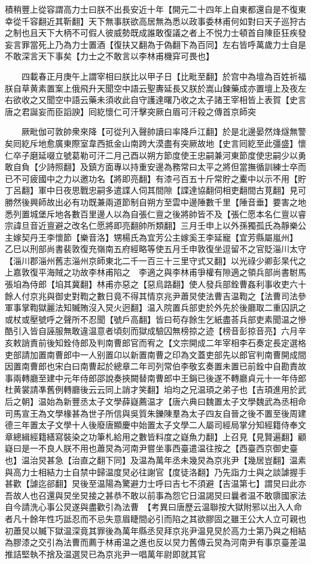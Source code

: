 積稍豐上從容謂高力士曰朕不出長安近十年【開元二十四年上自東都還自是不復東幸從千容翻近其靳翻】天下無事朕欲高居無為悉以政事委林甫何如對曰天子巡狩古之制也且天下大柄不可假人彼威勢既成誰敢復議之者上不悦力士頓首自陳臣狂疾發妄言罪當死上乃為力士置酒【復扶又翻為于偽翻下為百同】左右皆呼萬歲力士自是不敢深言天下事矣【力士之不敢言以李林甫機穽可畏也】

　　四載春正月庚午上謂宰相曰朕比以甲子日【比毗至翻】於宫中為壇為百姓祈福朕自草黄素置案上俄飛升天聞空中語云聖夀延長又朕於嵩山鍊藥成亦置壇上及夜左右欲收之又聞空中語云藥未須收此自守護達曙乃收之太子諸王宰相皆上表賀【史言唐之君誕妄而臣謟諛】囘紇懷仁可汗擊突厥白眉可汗殺之傳首京師突

　　厥毗伽可敦帥衆來降【可從刋入聲帥讀曰率降戶江翻】於是北邊晏然烽燧無警矣囘紇斥地愈廣東際室韋西抵金山南跨大漠盡有突厥故地【史言囘紇至此彊盛】懷仁卒子磨延啜立號葛勒可汗二月己酉以朔方節度使王忠嗣兼河東節度使忠嗣少以勇敢自負【少詩照翻】及鎮方面專以持重安邊為務常曰太平之將但當撫循訓練士卒而已不可疲國中之力以邀功名【將即亮翻】有漆弓百五十斤常貯之櫜中以示不用【貯丁呂翻】軍中日夜思戰忠嗣多遣諜人伺其間隙【諜達協翻伺相吏翻間古莧翻】見可勝然後興師故出必有功既兼兩道節制自朔方至雲中邊陲數千里【陲音垂】要害之地悉列置城堡斥地各數百里邊人以為自張仁亶之後將帥皆不及【張仁愿本名仁亶以睿宗諱旦音近亶避之改名仁愿將即亮翻帥所類翻】三月壬申上以外孫獨孤氏為靜樂公主嫁契丹王李懷節【樂音洛】甥楊氏為宜芳公主嫁奚王李延寵【宜芳縣屬嵐州】　乙巳以刑部尚書裴敦復充嶺南五府經略等使五月壬申敦復坐逗留不之官貶淄川太守【淄川郡淄州舊志淄州京師東北二千一百三十三里守式又翻】以光祿少卿彭杲代之上嘉敦復平海賊之功故李林甫陷之　李適之與李林甫爭權有隙適之領兵部尚書駙馬張垍為侍郎【垍其冀翻】林甫亦惡之【惡烏路翻】使人發兵部銓曹姦利事收吏六十餘人付京兆與御史對鞫之數日竟不得其情京兆尹蕭炅使法曹吉温鞫之【法曹司法參軍事掌鞫獄麗法知贓賄沒入炅火迥翻】温入院置兵部吏於外先於後廳取二重囚訊之或杖或壓號呼之聲所不忍聞【號戶高翻】皆曰苟存餘生乞紙盡荅兵部吏素聞温之慘酷引入皆自誣服無敢違温意者頃刻而獄成驗囚無榜掠之迹【榜音彭掠音亮】六月辛亥敕誚責前後知銓侍郎及判南曹郎官而宥之【文宗開成二年宰相李石奏定長定選格吏部請加置南曹郎中一人别置卬以新置南曹之印為文蓋吏部先以郎官判南曹開成間因置南曹郎也宋白曰南曹起於總章二年司列常伯李敬玄奏置未置已前銓中自勘責故事兩轉廳至建中元年侍郎邵說奏挾闕替南曹郎中王鋗已後遂不轉廳貞元十一年侍郎杜黄裳請凖舊例轉廳後云云同上誚才笑翻】垍均之兄温頊之弟子也【吉頊進用於武后之朝】温始為新豐丞太子文學薛嶷薦温才【唐六典曰魏置太子文學魏武為丞相命司馬宣王為文學椽甚為世子所信與吳質朱鑠陳羣為太子四友自晉之後不置至後周建德三年置太子文學十人後廢唐顯慶中始置太子文學二人屬司經局掌分知經籍侍奉文章總緝經籍繕寫裝染之功筆札給用之數皆料度之嶷魚力翻】上召見【見賢遍翻】顧嶷曰是一不良人朕不用也蕭炅為河南尹嘗坐事西臺遣温往按之【西臺西京御史臺也】温治炅甚急【治直之翻下同】及温為萬年丞未幾炅為京兆尹【幾居豈翻】温素與高力士相結力士自禁中歸温度炅必往謝官【度徒洛翻】乃先詣力士與之談謔握手甚歡【謔迄郤翻】炅後至温陽為驚避力士呼曰吉七不須避【吉温第七】謂炅曰此亦吾故人也召還與炅坐炅接之甚恭不敢以前事為怨它日温謁炅曰曩者温不敢隳國家法自今請洗心事公炅遂與盡歡引為法曹　【考異曰唐歷云温聯按大獄附邪以出入人命者凡十餘年性巧詆忍而不忌失意眉睫間必引而陷之其欲膠固之雖王公大人立可親也初蕭炅以贓下獄温深竟其罪後為萬年縣丞炅拜京兆尹温見炅於高力士第乃與之相結為膠漆之交引為法曹而薦于林甫温之進也反以炅力舊傳云炅為河南尹有事京臺差温推詰堅執不捨及温選炅已為京兆尹一唱萬年尉即就其官